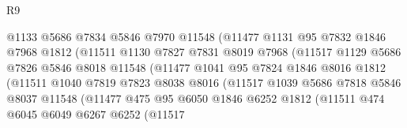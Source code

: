 \begin{lexlean}{R9}
\begin{coremodule}
                              @1133
                              @5686
                              @7834
                              @5846
                              @7970
                              @11548
                              (@11477
                                @1131
                                @95
                                @7832
                                @1846
                                @7968
                                @1812
                                (@11511
                                  @1130
                                  @7827
                                  @7831
                                  @8019
                                  @7968
                                  (@11517
                                    @1129
                                    @5686
                                    @7826
                                    @5846
                                    @8018
                                    @11548
                                    (@11477
                                      @1041
                                      @95
                                      @7824
                                      @1846
                                      @8016
                                      @1812
                                      (@11511
                                        @1040
                                        @7819
                                        @7823
                                        @8038
                                        @8016
                                        (@11517
                                          @1039
                                          @5686
                                          @7818
                                          @5846
                                          @8037
                                          @11548
                                          (@11477
                                            @475
                                            @95
                                            @6050
                                            @1846
                                            @6252
                                            @1812
                                            (@11511
                                              @474
                                              @6045
                                              @6049
                                              @6267
                                              @6252
                                              (@11517

\end{coremodule}
\end{lexlean}
